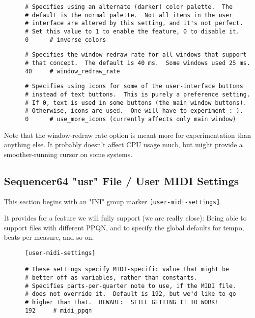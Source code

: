    \begin{verbatim}
      # Specifies using an alternate (darker) color palette.  The
      # default is the normal palette.  Not all items in the user
      # interface are altered by this setting, and it's not perfect.
      # Set this value to 1 to enable the feature, 0 to disable it.
      0      # inverse_colors
   \end{verbatim}

   \begin{verbatim}
      # Specifies the window redraw rate for all windows that support
      # that concept.  The default is 40 ms.  Some windows used 25 ms.
      40     # window_redraw_rate
   \end{verbatim}

   \begin{verbatim}
      # Specifies using icons for some of the user-interface buttons
      # instead of text buttons.  This is purely a preference setting.
      # If 0, text is used in some buttons (the main window buttons).
      # Otherwise, icons are used.  One will have to experiment :-).
      0      # use_more_icons (currently affects only main window)
   \end{verbatim}

   Note that the window-redraw rate option is meant more for experimentation
   than anything else.  It probably doesn't affect CPU usage much, but might
   provide a smoother-running cursor on some systems.

\subsection{Sequencer64 "usr" File / User MIDI Settings}
\label{subsec:seq64_usr_file_user_midi_settings}

   This section begins with an
   "INI" group marker \texttt{[user-midi-settings]}.

   It provides for a feature we will fully support (we are really close):
   Being able to support files with different PPQN, and to specify the
   global defaults for tempo, beats per measure, and so on.

   \begin{verbatim}
      [user-midi-settings]

      # These settings specify MIDI-specific value that might be
      # better off as variables, rather than constants.
      # Specifies parts-per-quarter note to use, if the MIDI file.
      # does not override it.  Default is 192, but we'd like to go
      # higher than that.  BEWARE:  STILL GETTING IT TO WORK!
      192     # midi_ppqn
   \end{verbatim}

